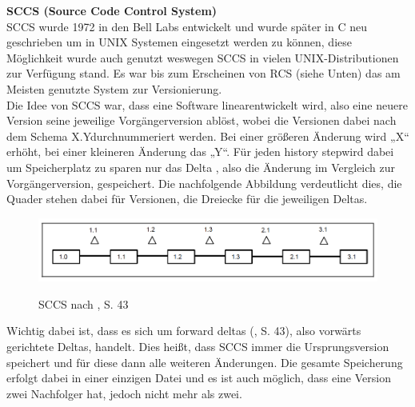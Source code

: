 \textbf{SCCS (Source Code Control System)}
\\
\acs{SCCS} wurde 1972 in den Bell Labs entwickelt und wurde später in C neu geschrieben um in UNIX Systemen eingesetzt werden zu können, diese Möglichkeit wurde auch genutzt weswegen SCCS in vielen UNIX-Distributionen zur Verfügung stand. Es war bis zum Erscheinen von RCS (siehe Unten) das am Meisten genutzte System zur Versionierung. 
\\
Die Idee von SCCS war, dass eine Software \Gu linear\Go entwickelt wird, also eine neuere Version seine jeweilige Vorgängerversion ablöst, wobei die Versionen dabei nach dem Schema \Gu X.Y\Go durchnummeriert werden. Bei einer größeren Änderung wird „X“ erhöht, bei einer kleineren Änderung das „Y“. Für jeden \Gu history step\Go wird dabei um Speicherplatz zu sparen nur das \Gu Delta \Go, also die Änderung im Vergleich zur Vorgängerversion, gespeichert. Die nachfolgende Abbildung verdeutlicht dies, die Quader stehen dabei für Versionen, die Dreiecke für die jeweiligen Deltas.
\begin{figure}[H]
	\includegraphics[width=\textwidth]{img/vcm1.png}
	\label{fig:vcm1}
	\caption{ SCCS nach \cite{cm_vc}, S. 43}
\end{figure}

Wichtig dabei ist, dass es sich um \Gu forward deltas \Go (\cite{cm_vc}, S. 43), also vorwärts gerichtete Deltas, handelt. Dies heißt, dass SCCS immer die Ursprungsversion speichert und für diese dann alle weiteren Änderungen. Die gesamte Speicherung erfolgt dabei in einer einzigen Datei und es ist auch möglich, dass eine Version zwei Nachfolger hat, jedoch nicht mehr als zwei. \cite{itil_infosec}

